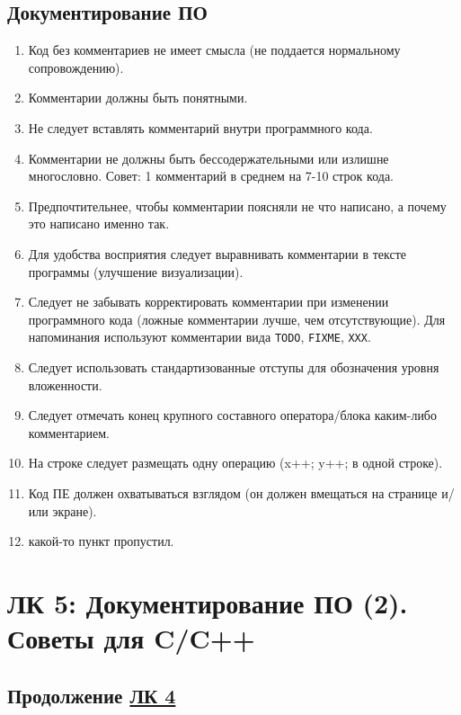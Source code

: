 \documentclass[a4paper, 12pt]{article}
\newcommand{\code}[1]{\texttt{#1}} %
\begin{document}
\subsection*{Документирование ПО}
\begin{enumerate}
    \item Код без комментариев не имеет смысла (не поддается нормальному сопровождению).
    \item Комментарии должны быть понятными.
    \item Не следует вставлять комментарий внутри программного кода.
    \item Комментарии не должны быть бессодержательными или излишне многословно. Совет: 1 комментарий в среднем на 7-10 строк кода.
    \item Предпочтительнее, чтобы комментарии поясняли не что написано, а почему это написано именно так.
    \item Для удобства восприятия следует выравнивать комментарии в тексте программы (улучшение визуализации). 
    \item Следует не забывать корректировать комментарии при изменении программного кода (ложные комментарии лучше, чем отсутствующие). Для напоминания используют комментарии вида \code{TODO}, \code{FIXME}, \code{XXX}.
    \item Следует использовать стандартизованные отступы для обозначения уровня вложенности.
    \item Следует отмечать конец крупного составного оператора/блока каким-либо комментарием.
    \item На строке следует размещать одну операцию (x++; y++; в одной строке).
    \item Код ПЕ должен охватываться взглядом (он должен вмещаться на странице и/или экране).
    \item какой-то пункт пропустил.
\end{enumerate}

\newpage

\section{ЛК 5: Документирование ПО (2). Советы для C/C++}
\label{sec:l5}

\subsection*{Продолжение \hyperref[sec:l4]{ЛК 4}} 
\end{document}
